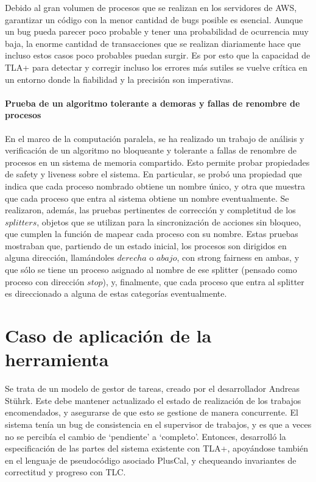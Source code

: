 \documentclass[runningheads]{llncs}
\begin{document}
Debido al gran volumen de procesos que se realizan en los servidores de AWS, garantizar un código con la menor cantidad de bugs posible es esencial. Aunque un bug pueda parecer poco probable y tener una probabilidad de ocurrencia muy baja, la enorme cantidad de transacciones que se realizan diariamente hace que incluso estos casos poco probables puedan surgir. Es por esto que la capacidad de TLA+ para detectar y corregir incluso los errores más sutiles se vuelve crítica en un entorno donde la fiabilidad y la precisión son imperativas.\cite{amazon}

\paragraph{Prueba de un algoritmo tolerante a demoras y fallas de renombre de procesos}
En el marco de la computación paralela, se ha realizado un trabajo de análisis y verificación de un algoritmo no bloqueante y tolerante a fallas de renombre de procesos en un sistema de memoria compartido. Esto permite probar propiedades de safety y liveness sobre el sistema. En particular, se probó una propiedad que indica que cada proceso nombrado obtiene un nombre único, y otra que muestra que cada proceso que entra al sistema obtiene un nombre eventualmente. Se realizaron, además, las pruebas pertinentes de corrección y completitud de los $splitters$, objetos que se utilizan para la sincronización de acciones sin bloqueo, que cumplen la función de mapear cada proceso con su nombre. Estas pruebas mostraban que, partiendo de un estado inicial, los procesos son dirigidos en alguna dirección, llamándoles $derecha$ o $abajo$, con strong fairness en ambas, y que sólo se tiene un proceso asignado al nombre de ese splitter (pensado como proceso con dirección $stop$), y, finalmente, que cada proceso que entra al splitter es direccionado a alguna de estas categorías eventualmente.\cite{renaming}

\section{Caso de aplicación de la herramienta}
Se trata de un modelo de gestor de tareas, creado por el desarrollador Andreas Stührk. Este debe mantener actualizado el estado de realización de los trabajos encomendados, y asegurarse de que esto se gestione de manera concurrente. El sistema tenía un bug de consistencia en el supervisor de trabajos, y es que a veces no se percibía el cambio de ‘pendiente’ a ‘completo’. Entonces, desarrolló la especificación de las partes del sistema existente con TLA+, apoyándose también en el lenguaje de pseudocódigo asociado PlusCal, y chequeando invariantes de correctitud y progreso con TLC.
\end{document}
